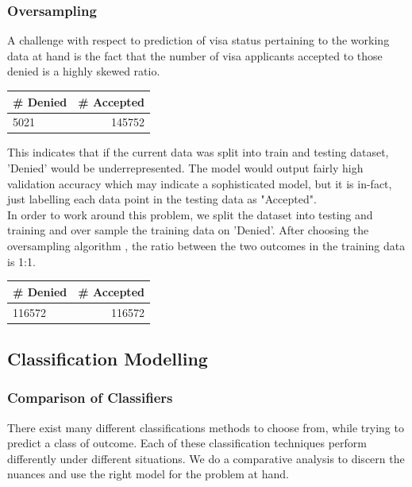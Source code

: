 \documentclass[conference]{IEEEtran}
\begin{document}
\subsubsection{\textbf{Oversampling}}
A challenge with respect to prediction of visa status pertaining to the working data at hand is the fact that the number of visa applicants accepted to those denied is a highly skewed ratio.

\begin{center}
  \begin{tabularx}{0.19\textwidth}{| l | r| }
  \hline
  \centering
     # Denied &
    # Accepted\\ \hline
    5021 & 145752 \\ \hline
  \end{tabularx}
  \end{center}

This indicates that if the current data was split into train and testing dataset, 'Denied' would be underrepresented. The model would output fairly high validation accuracy which may indicate a sophisticated model, but it is in-fact, just labelling each data point in the testing data as "Accepted". \\
In order to work around this problem, we split the dataset into testing and training and over sample the training data on 'Denied'. After choosing the oversampling algorithm \cite{oversample}, the ratio between the two outcomes in the training data is 1:1.

\begin{center}
  \begin{tabularx}{0.19\textwidth}{| l | r| }
  \hline
  \centering
     # Denied &
    # Accepted\\ \hline
    116572 & 116572 \\ \hline
    
  \end{tabularx}
  \end{center}

\subsection{\textbf{Classification Modelling}}
\subsubsection{\textbf{Comparison of Classifiers}}
There exist many different classifications methods to choose from, while trying to predict a class of outcome. Each of these classification techniques perform differently under different situations. We do a comparative analysis to discern the nuances and use the right model for the problem at hand.
\end{document}
